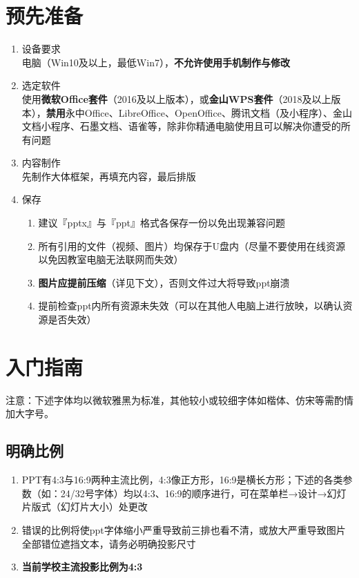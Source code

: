 \section[预先准备]{预先准备}
\begin{enumerate}
    \item 设备要求\\
          电脑（Win10及以上，最低Win7），\textbf{不允许使用手机制作与修改}
    \item 选定软件\\
          使用\textbf{微软Office套件}（2016及以上版本），或\textbf{金山WPS套件}（2018及以上版本），\textbf{禁用}永中Office、LibreOffice、OpenOffice、腾讯文档（及小程序）、金山文档小程序、石墨文档、语雀等，除非你精通电脑使用且可以解决你遭受的所有问题
    \item 内容制作\\
          先制作大体框架，再填充内容，最后排版
    \item 保存
          \begin{enumerate}
              \item 建议『pptx』与『ppt』格式各保存一份以免出现兼容问题
              \item 所有引用的文件（视频、图片）均保存于U盘内（尽量不要使用在线资源以免因教室电脑无法联网而失效）
              \item \textbf{图片应提前压缩}（详见下文），否则文件过大将导致ppt崩溃
              \item 提前检查ppt内所有资源未失效（可以在其他人电脑上进行放映，以确认资源是否失效）
          \end{enumerate}
\end{enumerate}

\section[入门指南]{入门指南}
注意：下述字体均以微软雅黑为标准，其他较小或较细字体如楷体、仿宋等需酌情加大字号。

\subsection[明确比例]{明确比例}
\begin{enumerate}
    \item PPT有4:3与16:9两种主流比例，4:3像正方形，16:9是横长方形；下述的各类参数（如：24/32号字体）均以4:3、16:9的顺序进行，可在菜单栏→设计→幻灯片版式（幻灯片大小）处更改
    \item 错误的比例将使ppt字体缩小严重导致前三排也看不清，或放大严重导致图片全部错位遮挡文本，请务必明确投影尺寸
    \item \textbf{当前学校主流投影比例为4:3}
\end{enumerate}

